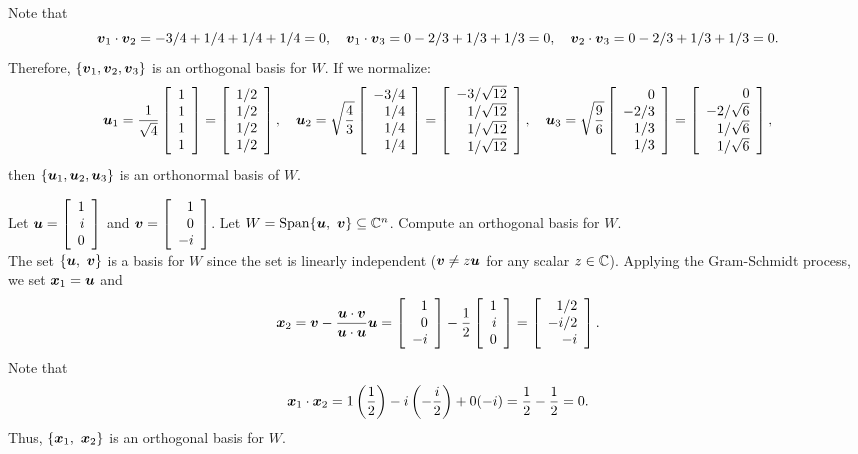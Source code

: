 \begin{Exam}
\begin{eqnarray*}
\end{eqnarray*} Note that
\[\bb v_1\cdot \bb v_2 = -3/4+1/4+1/4+1/4=0,\quad \bb v_1\cdot \bb v_3 = 0-2/3+1/3+1/3=0,\quad \bb v_2\cdot \bb v_3 = 0-2/3+1/3+1/3 = 0.\] Therefore, $\{\bb v_1, \bb v_2, \bb v_3\}$ is an orthogonal basis for $W$. If we normalize:
\[\bb u_1 = \dfrac{1}{\sqrt{4}}\vr{1\\1\\1\\1} = \vr{1/2\\1/2\\1/2\\1/2}, \quad \bb u_2 = \sqrt{\dfrac{4}{3}}\vr{-3/4\\1/4\\1/4\\1/4} = \vr{-3/\sqrt{12}\\1/\sqrt{12}\\1/\sqrt{12}\\1/\sqrt{12}},\quad \bb u_3 = \sqrt{\dfrac{9}{6}}\vr{0\\-2/3\\1/3\\1/3} = \vr{0\\-2/\sqrt{6}\\1/\sqrt{6}\\1/\sqrt{6}},\] then
$\{\bb u_1, \bb u_2, \bb u_3\}$ is an orthonormal basis of $W$.
\end{Exam}\vs


\begin{Exam} Let $\bb u = \vr{1 \\ i \\ 0}$ and $\bb v = \vr{1 \\ 0 \\ -i}$. Let $W = \Span\{\bb u,\ \bb v\} \subseteq \C^n$. Compute an orthogonal basis for $W$. \\

The set $\{\bb u,\ \bb v\}$ is a basis for $W$ since the set is linearly independent ($\bb v \neq z\bb u$ for any scalar $z\in \C$). Applying the Gram-Schmidt process, we set $\bb x_1 = \bb u$ and 
\[\bb x_2 = \bb v - \dfrac{\bb u \cdot \bb v}{\bb u \cdot \bb u}\bb u = \vr{1 \\ 0 \\ -i} - \dfrac{1}{2}\vr{1\\ i \\ 0} = \vr{1/2 \\ -i/2 \\ -i}.\] Note that 
\[\bb x_1 \cdot \bb x_2 = 1\left(\dfrac{1}{2}\right) - i\left(-\dfrac{i}{2}\right) + 0(-i) = \dfrac{1}{2} - \dfrac{1}{2} = 0.\] Thus, $\{\bb x_1,\ \bb x_2\}$ is an orthogonal basis for $W$.
\end{Exam}\vs

